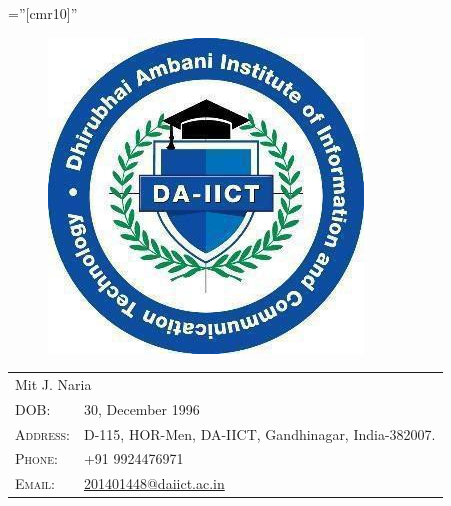 \documentclass[a4paper,10pt]{article}
\begin{document}
\font\fb=''[cmr10]'' %

\captionsetup[figure]{labelformat=empty}
\begin{minipage}{0.2\textwidth}
\begin{figure}[H]
\includegraphics[scale=0.42]{daiict.jpg}
\end{figure}
\end{minipage} \hfill
\begin{minipage}{0.71\textwidth}
\begin{tabular}{ll}
	\multicolumn{2}{l}{\Huge Mit J. Naria \vspace*{0.75\baselineskip}} \\
	\textsc{DOB:} & 30, December 1996 \\
	\textsc{Address:}	& D-115, HOR-Men, DA-IICT, Gandhinagar, India-382007. \\
	\textsc{Phone:}		& +91 9924476971 \\
	\textsc{Email:} & \href{mailto:201401448@daiict.ac.in}{201401448@daiict.ac.in} \\
\end{tabular}
\end{minipage}


\end{document}
